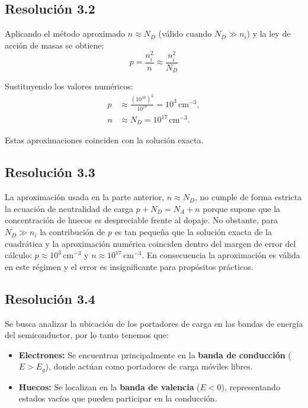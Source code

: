 \documentclass[
  11pt,
  letterpaper,
   addpoints,
  ]{exam}
\begin{document}
\begin{questions}
\begin{solution}
\subsection*{Resolución 3.2}
    Aplicando el método aproximado $n \approx N_D$ (válido cuando $N_D\gg n_i$) y la ley de acción de masas se obtiene:
    \begin{equation}
        p = \frac{n_i^2}{n} \approx \frac{n_i^2}{N_D}
    \end{equation}

    Sustituyendo los valores numéricos:
    \begin{align}
        p &\approx \frac{(10^{10})^2}{10^{17}} = 10^{3}\,\mathrm{cm^{-3}}, \\
        n &\approx N_D = 10^{17}\,\mathrm{cm^{-3}}.
    \end{align}

    Estas aproximaciones coinciden con la solución exacta.
\subsection*{Resolución 3.3}

    La aproximación usada en la parte anterior, $n\approx N_D$, no cumple de forma estricta la ecuación de neutralidad de carga $p+N_D=N_A+n$ porque supone que la concentración de huecos es despreciable frente al dopaje. No obstante, para $N_D\gg n_i$ la contribución de $p$ es tan pequeña que la solución exacta de la cuadrática y la aproximación numérica coinciden dentro del margen de error del cálculo: $p\approx10^{3}\,\mathrm{cm^{-3}}$ y $n\approx10^{17}\,\mathrm{cm^{-3}}$. En consecuencia la aproximación es válida en este régimen y el error es insignificante para propósitos prácticos.
\subsection*{Resolución 3.4}
Se busca analizar la ubicación de los portadores de carga en las bandas de energía del semiconductor, por lo tanto tenemos que:
    \begin{itemize}
        \item \textbf{Electrones:} Se encuentran principalmente en la \textbf{banda de conducción} ($E > E_g$), donde actúan como portadores de carga móviles libres.
        \item \textbf{Huecos:} Se localizan en la \textbf{banda de valencia} ($E < 0$), representando estados vacíos que pueden participar en la conducción.
    \end{itemize}


\end{solution}
\end{questions}
\end{document}
